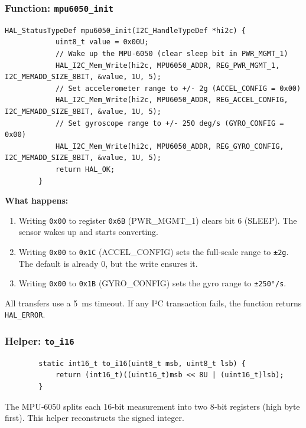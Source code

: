 \documentclass[12pt,a4paper]{article}
\newcommand{\func}[1]{\texttt{#1}}
\begin{document}
	\subsubsection*{Function: \func{mpu6050\_init}}
	\begin{lstlisting}[caption=Sensor initialisation, label=lst:mpu_init]
		HAL_StatusTypeDef mpu6050_init(I2C_HandleTypeDef *hi2c) {
			uint8_t value = 0x00U;
			// Wake up the MPU-6050 (clear sleep bit in PWR_MGMT_1)
			HAL_I2C_Mem_Write(hi2c, MPU6050_ADDR, REG_PWR_MGMT_1, I2C_MEMADD_SIZE_8BIT, &value, 1U, 5);
			// Set accelerometer range to +/- 2g (ACCEL_CONFIG = 0x00)
			HAL_I2C_Mem_Write(hi2c, MPU6050_ADDR, REG_ACCEL_CONFIG, I2C_MEMADD_SIZE_8BIT, &value, 1U, 5);
			// Set gyroscope range to +/- 250 deg/s (GYRO_CONFIG = 0x00)
			HAL_I2C_Mem_Write(hi2c, MPU6050_ADDR, REG_GYRO_CONFIG, I2C_MEMADD_SIZE_8BIT, &value, 1U, 5);
			return HAL_OK;
		}
	\end{lstlisting}
	\textbf{What happens:}
	\begin{enumerate}
		\item Writing \texttt{0x00} to register \texttt{0x6B} (PWR\_MGMT\_1) clears bit 6 (SLEEP). The sensor wakes up and starts converting.
		\item Writing \texttt{0x00} to \texttt{0x1C} (ACCEL\_CONFIG) sets the full‑scale range to \texttt{±2g}. The default is already 0, but the write ensures it.
		\item Writing \texttt{0x00} to \texttt{0x1B} (GYRO\_CONFIG) sets the gyro range to \texttt{±250°/s}.
	\end{enumerate}
	All transfers use a \SI{5}{\milli\second} timeout. If any I²C transaction fails, the function returns \texttt{HAL\_ERROR}.
	
	\subsubsection*{Helper: \func{to\_i16}}
	\begin{lstlisting}
		static int16_t to_i16(uint8_t msb, uint8_t lsb) {
			return (int16_t)((uint16_t)msb << 8U | (uint16_t)lsb);
		}
	\end{lstlisting}
	The MPU‑6050 splits each 16‑bit measurement into two 8‑bit registers (high byte first). This helper reconstructs the signed integer.
	
\end{document}

